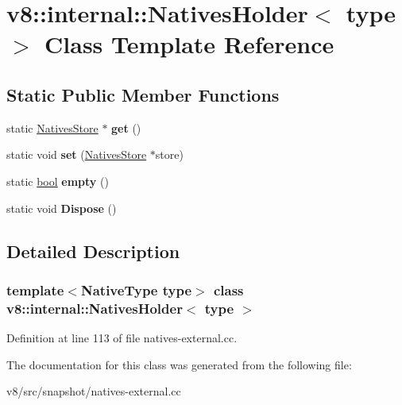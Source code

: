 \hypertarget{classv8_1_1internal_1_1NativesHolder}{}\section{v8\+:\+:internal\+:\+:Natives\+Holder$<$ type $>$ Class Template Reference}
\label{classv8_1_1internal_1_1NativesHolder}
\subsection*{Static Public Member Functions}
\begin{DoxyCompactItemize}
\item 
\mbox{\label{classv8_1_1internal_1_1NativesHolder_a132e470b1bc472fd50433504c0d859e7}} 
static \mbox{\hyperlink{classv8_1_1internal_1_1NativesStore}{Natives\+Store}} $\ast$ {\bfseries get} ()
\item 
\mbox{\label{classv8_1_1internal_1_1NativesHolder_a9e1d218642005655136a936c63201797}} 
static void {\bfseries set} (\mbox{\hyperlink{classv8_1_1internal_1_1NativesStore}{Natives\+Store}} $\ast$store)
\item 
\mbox{\label{classv8_1_1internal_1_1NativesHolder_a97c8f541c2a322374a056b12514a4b2e}} 
static \mbox{\hyperlink{classbool}{bool}} {\bfseries empty} ()
\item 
\mbox{\label{classv8_1_1internal_1_1NativesHolder_aeef47bb3ec91a0773cad0119f855ac97}} 
static void {\bfseries Dispose} ()
\end{DoxyCompactItemize}


\subsection{Detailed Description}
\subsubsection*{template$<$Native\+Type type$>$\newline
class v8\+::internal\+::\+Natives\+Holder$<$ type $>$}



Definition at line 113 of file natives-\/external.\+cc.



The documentation for this class was generated from the following file\+:\begin{DoxyCompactItemize}
\item 
v8/src/snapshot/natives-\/external.\+cc\end{DoxyCompactItemize}
